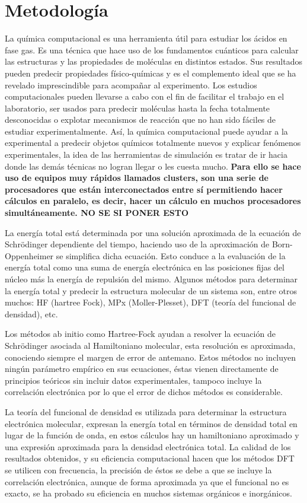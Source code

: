 \chapter{Metodología}

La química computacional es una herramienta útil para estudiar los ácidos en fase gas. Es una técnica que hace uso de los fundamentos cuánticos para calcular las estructuras y las propiedades de moléculas en distintos estados. Sus resultados pueden predecir propiedades físico-químicas y es el complemento ideal que se ha revelado imprescindible para acompañar al experimento. Los estudios computacionales pueden llevarse a cabo con el fin de facilitar el trabajo en el laboratorio, ser usados para predecir moléculas hasta la fecha totalmente desconocidas o explotar mecanismos de reacción que no han sido fáciles de estudiar experimentalmente. Así, la química computacional puede ayudar a la experimental a predecir objetos químicos totalmente nuevos y explicar fenómenos experimentales, la idea de las herramientas de simulación es tratar de ir hacia donde las demás técnicas no logran llegar o les cuesta mucho. {\bfseries Para ello se hace uso de equipos muy rápidos llamados clusters, son una serie de procesadores que están interconectados entre sí permitiendo hacer cálculos en paralelo, es decir, hacer un cálculo en muchos procesadores simultáneamente. NO SE SI PONER ESTO}

La energía total está determinada por una solución aproximada de la ecuación de Schrödinger dependiente del tiempo, haciendo uso de la aproximación de Born-Oppenheimer se simplifica dicha ecuación. Esto conduce a la evaluación de la energía total como una suma de energía electrónica en las posiciones fijas del núcleo más la energía de repulsión del mismo. Algunos métodos para determinar la energía total y predecir la estructura molecular de un sistema son, entre otros muchos: HF (hartree Fock), MPx (Moller-Plesset), DFT (teoría del funcional de densidad), etc. \cite {quimica2}

Los métodos ab initio como Hartree-Fock ayudan a resolver la ecuación de Schrödinger asociada al Hamiltoniano molecular, esta resolución es aproximada, conociendo siempre el margen de error de antemano. Estos métodos no incluyen ningún parámetro empírico en sus ecuaciones, éstas vienen directamente de principios teóricos sin incluir datos experimentales, tampoco incluye la correlación electrónica por lo que el error de dichos métodos es considerable.

La teoría del funcional de densidad es utilizada para determinar la estructura electrónica molecular, expresan la energía total en términos de densidad total en lugar de la función de onda, en estos cálculos hay un hamiltoniano aproximado y una expresión aproximada para la densidad electrónica total. La calidad de los resultados obtenidos, y su eficiencia computacional hacen que los métodos DFT se utilicen con frecuencia, la precisión de éstos se debe a que se incluye la correlación electrónica, aunque de forma aproximada ya que el funcional no es exacto, se ha probado su eficiencia en muchos sistemas orgánicos e inorgánicos.

